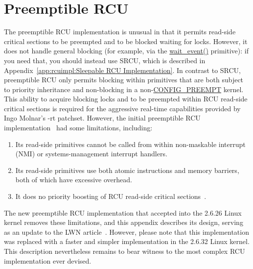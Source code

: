 
\section{Preemptible RCU}
\label{app:rcuimpl:Preemptible RCU}

The preemptible RCU implementation is unusual in that
it permits read-side critical
sections to be preempted and to be blocked waiting for locks.
However, it does not handle general blocking
(for example, via the \url{wait_event()} primitive):
if you need that, you should instead use SRCU, which is described in
Appendix~\ref{app:rcuimpl:Sleepable RCU Implementation}.
In contrast to SRCU,
preemptible RCU only permits blocking within primitives that are
both subject to priority inheritance and non-blocking in a
non-\url{CONFIG_PREEMPT} kernel.
This ability to acquire blocking locks and to be preempted within
RCU read-side critical sections is required for the aggressive real-time
capabilities provided by Ingo Molnar's -rt patchset.
However, the initial preemptible RCU implementation~\cite{PaulMcKenney2005d}
had some limitations, including:

\begin{enumerate}
\item	Its read-side primitives cannot be called from within
	non-maskable interrupt (NMI) or systems-management interrupt
	handlers.
\item	Its read-side primitives use both atomic instructions and
	memory barriers, both of which have excessive overhead.
\item	It does no priority boosting of RCU read-side critical
	sections~\cite{PaulEMcKenney2007BoostRCU}.
\end{enumerate}

The new preemptible RCU implementation that accepted into the 2.6.26
Linux kernel
removes these limitations, and this appendix describes its design,
serving as an update to the LWN article~\cite{PaulEMcKenney2007PreemptibleRCU}.
However, please note that this implementation was replaced with a faster
and simpler implementation in the 2.6.32 Linux kernel.
This description nevertheless remains to bear witness to the most complex
RCU implementation ever devised.

